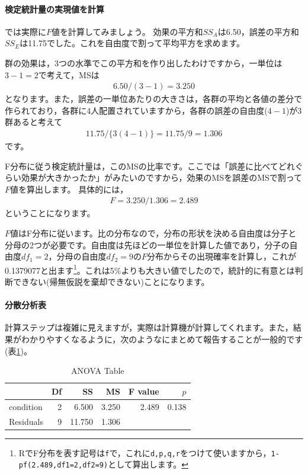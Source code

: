 \documentclass{ltjbook}
\begin{document}
\paragraph{検定統計量の実現値を計算}
では実際に$F$値を計算してみましょう。
効果の平方和$SS_A$は6.50，誤差の平方和$SS_E$は11.75でした。これを自由度で割って平均平方を求めます。

群の効果は，3つの水準でこの平方和を作り出したわけですから，一単位は$3-1=2$で考えて，MSは
\begin{align}
6.50 / (3-1) = 3.250
\end{align}
となります。また，誤差の一単位あたりの大きさは，各群の平均と各値の差分で作られており，各群に4人配置されていますから，各群の誤差の自由度($4-1$)が3群あると考えて
\begin{align}
11.75/\{3(4-1)\}=11.75/9 = 1.306
\end{align}
です。

F分布に従う検定統計量は，このMSの比率です。ここでは「誤差に比べてどれぐらい効果が大きかったか」がみたいのですから，効果のMSを誤差のMSで割って$F$値を算出します。
具体的には，
\begin{align}
F = 3.250/1.306 = 2.489
\end{align}
ということになります。

$F$値はF分布に従います。比の分布なので，分布の形状を決める自由度は分子と分母の2つが必要です。自由度は先ほどの一単位を計算した値であり，分子の自由度$df_1 =2$，分母の自由度$df_2 = 9$の$F$分布からその出現確率を計算し，これが0.1379077と出ます\footnote{RでF分布を表す記号は\texttt{f}で，これに\texttt{d,p,q,r}をつけて使いますから，\texttt{1-pf(2.489,df1=2,df2=9)}として算出します。}。これは5\%よりも大きい値でしたので，統計的に有意とは判断できない(帰無仮説を棄却できない)ことになります。

\paragraph{分散分析表}
計算ステップは複雑に見えますが，実際は計算機が計算してくれます。また，結果がわかりやすくなるように，次のようなにまとめて報告することが一般的です(表\ref{tbl:19_01})。
\begin{table}[ht]
	\centering
	\caption{ANOVA Table}
	\begin{tabular}{lrrrrr}
		\hline
		          & Df & SS     & MS    & F value & $p$   \\
		\hline
		condition & 2  & 6.500  & 3.250 & 2.489   & 0.138 \\
		Residuals & 9  & 11.750 & 1.306 &         &       \\
		\hline
	\end{tabular}
	\label{tbl:19_01}
\end{table}
\end{document}
